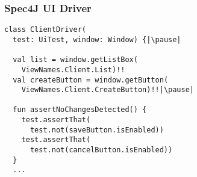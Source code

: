 \begin{frame}[fragile] \frametitle{Spec4J UI Driver}
\begin{lstlisting}
class ClientDriver(
  test: UiTest, window: Window) {|\pause|
  
  val list = window.getListBox(
    ViewNames.Client.List)!!
  val createButton = window.getButton(
    ViewNames.Client.CreateButton)!!|\pause|
    
  fun assertNoChangesDetected() {
    test.assertThat(
      test.not(saveButton.isEnabled))
    test.assertThat(
      test.not(cancelButton.isEnabled))
  }
  ...
\end{lstlisting}
\end{frame}





